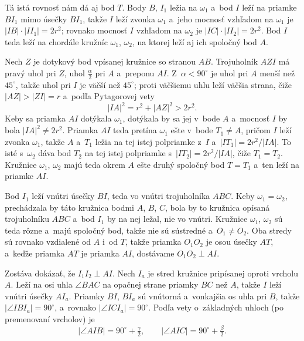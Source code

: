 {    Tá istá rovnosť nám dá aj bod $T$. Body $B$, $I_1$ ležia na $\omega_1$ a~bod $I$ leží na priamke $BI_1$ mimo úsečky $BI_1$, takže $I$ leží zvonka $\omega_1$ a~jeho mocnosť vzhľadom na $\omega_1$ je $|IB| \cdot |II_1| = 2r^2$; rovnako mocnosť $I$ vzhľadom na $\omega_2$ je $|IC| \cdot |II_2| = 2r^2$. Bod $I$ teda leží na chordále kružníc $\omega_1$, $\omega_2$, na ktorej leží aj ich spoločný bod $A$.

    Nech $Z$ je dotykový bod vpísanej kružnice so stranou $AB$. Trojuholník $AZI$ má pravý uhol pri $Z$, uhol $\frac\alpha2$ pri $A$ a~preponu $AI$. Z~$\alpha < 90^\circ$ je uhol pri $A$ menší než $45^\circ$, takže uhol pri $I$ je väčší než $45^\circ$; proti väčšiemu uhlu leží väčšia strana, čiže $|AZ| > |ZI| = r$ a~podľa Pytagorovej vety
    $$
    |IA|^2 = r^2 + |AZ|^2 > 2r^2.
    $$
    Keby sa priamka $AI$ dotýkala $\omega_1$, dotýkala by sa jej v~bode $A$ a~mocnosť $I$ by bola $|IA|^2 \neq 2r^2$. Priamka $AI$ teda pretína $\omega_1$ ešte v~bode $T_1 \neq A$, pričom $I$ leží zvonka $\omega_1$, takže $A$ a~$T_1$ ležia na tej istej polpriamke z~$I$ a~$|IT_1| = 2r^2/|IA|$. To isté s~$\omega_2$ dáva bod $T_2$ na tej istej polpriamke s~$|IT_2| = 2r^2/|IA|$, čiže $T_1 = T_2$. Kružnice $\omega_1$, $\omega_2$ majú teda okrem $A$ ešte druhý spoločný bod $T = T_1$ a~ten leží na priamke $AI$.

    Bod $I_1$ leží vnútri úsečky $BI$, teda vo vnútri trojuholníka $ABC$. Keby $\omega_1 = \omega_2$, prechádzala by táto kružnica bodmi $A$, $B$, $C$, bola by to kružnica opísaná trojuholníku $ABC$ a~bod $I_1$ by na nej ležal, nie vo vnútri. Kružnice $\omega_1$, $\omega_2$ sú teda rôzne a~majú spoločný bod, takže nie sú sústredné a~$O_1 \neq O_2$. Oba stredy sú rovnako vzdialené od $A$ i~od $T$, takže priamka $O_1O_2$ je osou úsečky $AT$, a~keďže priamka $AT$ je priamka $AI$, dostávame $O_1O_2 \perp AI$.

    Zostáva dokázať, že $I_1I_2 \perp AI$. Nech $I_a$ je stred kružnice pripísanej oproti vrcholu $A$. Leží na osi uhla $\angle BAC$ na opačnej strane priamky $BC$ než $A$, takže $I$ leží vnútri úsečky $AI_a$. Priamky $BI$, $BI_a$ sú vnútorná a~vonkajšia os uhla pri $B$, takže $|\angle IBI_a| = 90^\circ$, a~rovnako $|\angle ICI_a| = 90^\circ$. Podľa vety o~základných uhloch (po premenovaní vrcholov) je
    $$
    |\angle AIB| = 90^\circ + \tfrac\gamma2, \qquad |\angle AIC| = 90^\circ + \tfrac\beta2.
    $$

}
